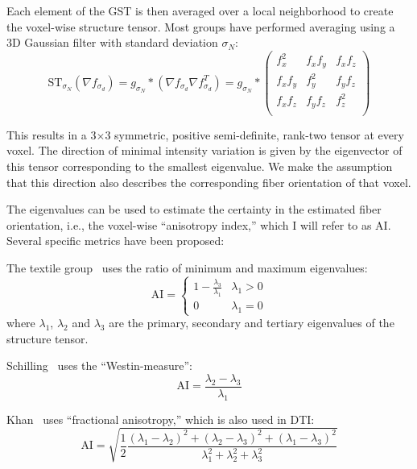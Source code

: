 \documentclass[11pt]{article}
\begin{document}
Each element of the GST is then averaged over a local neighborhood to create the
voxel-wise structure tensor. Most groups have performed averaging using a 3D
Gaussian filter with standard deviation $\sigma_N$:
\begin{equation}
  \label{eq:ST}
  \text{ST}_{\sigma_N}\left(\nabla f_{\sigma_d}\right) = g_{\sigma_N} \ast
  \left(\nabla f_{\sigma_d} \nabla f_{\sigma_d}^T \right) = g_{\sigma_N} \ast
  \begin{pmatrix}
    f_x^2 & f_x f_y & f_x f_z \\
    f_x f_y & f_y^2 & f_y f_z \\
    f_x f_z & f_y f_z & f_z^2 \\
  \end{pmatrix}
\end{equation}

This results in a 3$\times$3 symmetric, positive semi-definite, rank-two tensor
at every voxel. The direction of minimal intensity variation is given by the
eigenvector of this tensor corresponding to the smallest eigenvalue. We make the
assumption that this direction also describes the corresponding fiber
orientation of that voxel.

The eigenvalues can be used to estimate the certainty in the estimated fiber
orientation, i.e., the voxel-wise ``anisotropy index,'' which I will refer to as
AI. Several specific metrics have been proposed:

The textile group~\cite{Straumit2015} uses the ratio of minimum and maximum
eigenvalues:
\begin{equation}
  \label{eq:eigratio}
  \text{AI} =
  \begin{cases}
    1 - \frac{\lambda_3}{\lambda_1} & \lambda_1 > 0\\
    0 & \lambda_1 = 0
  \end{cases}
\end{equation}
where $\lambda_1$, $\lambda_2$ and $\lambda_3$ are the primary, secondary and
tertiary eigenvalues of the structure tensor.

Schilling~\cite{Schilling2016, Schilling2018} uses the ``Westin-measure'':
\begin{equation}
  \label{eq:westin}
  \text{AI} = \frac{\lambda_2 - \lambda_3}{\lambda_1}
\end{equation}

Khan~\cite{Khan2015} uses ``fractional anisotropy,'' which is also used in DTI:
\begin{equation}
  \label{eq:FA}
  \text{AI} = \sqrt{\frac{1}{2}\frac{(\lambda_1-\lambda_2)^2 + (\lambda_2-\lambda_3)^2 +
      (\lambda_1 - \lambda_3)^2}{\lambda_1^2 + \lambda_2^2 + \lambda_3^2}}
\end{equation}
\end{document}
